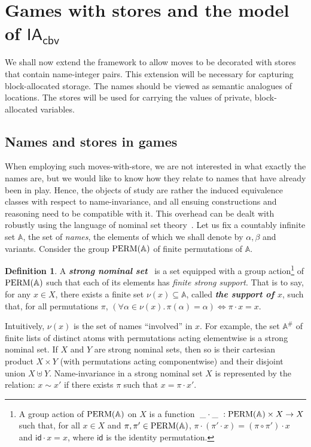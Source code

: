 \documentclass{CSML}
\theoremstyle{definition}\newtheorem{definition}[thm]{Definition}
\theoremstyle{definition}\newtheorem{example}[thm]{Example}
\theoremstyle{definition}\newtheorem{proposition}[thm]{Proposition}
\theoremstyle{definition}\newtheorem{lemma}[thm]{Lemma}
\theoremstyle{definition}\newtheorem{theorem}[thm]{Theorem}
\theoremstyle{definition}\newtheorem{corollary}[thm]{Corollary}
\theoremstyle{definition}\newtheorem{remark}[thm]{Remark}
\newcommand\nb{\beta}
\newcommand\actn{\cdot}
\newcommand\boldemph[1]{\emph{\textbf{#1}}}
\newcommand{\permg}{{\rm PERM}}
\newcommand\A{\mathbb{A}}
\newcommand\iacbv{\mathsf{IA}_{\mathsf{cbv}}}
\newcommand\na\alpha
\begin{document}
\section{Games with stores and the model of \texorpdfstring{$\iacbv$}{IAcbv}}

We shall now extend the framework to allow moves to be decorated with
stores that contain name-integer pairs. 
This extension will be necessary for capturing block-allocated storage.
The names should be viewed as semantic analogues of locations.
The stores will be used for carrying the values of private, block-allocated variables.

\subsection{Names and stores in games}

When employing such moves-with-store, we are not interested in what exactly the names are,
but we would like to know how they relate to names that have already been in play. Hence,
the objects of study are rather the induced equivalence classes with respect to name-invariance, and all ensuing constructions and reasoning need to be compatible with it. This overhead can be dealt with robustly using the language of nominal set theory~\cite{GP02}.
Let us fix a countably infinite set $\A$, the set of \emph{names}, the elements of which we shall denote by $\na,\nb$ and variants. Consider the group $\permg(\A)$ of finite permutations of $\A$. 

\begin{definition}
A \boldemph{strong nominal set}~\cite{GP02,Tze09}
is a set equipped with a group action\footnote{A group action of $\permg(\A)$ on $X$ is a function\, $\_\cdot\_\ :\permg(\A)\times X\rightarrow X$\, such that, for all $x\in X$ and $\pi,\pi'\in\permg(\A)$, $\pi\cdot(\pi'\cdot x)=(\pi\circ\pi')\cdot x$  and $\mathsf{id}\cdot x = x$, where $\mathsf{id}$ is the identity permutation.}
of $\permg(\A)$
such that each of its elements has \emph{finite strong support}. That is to say, for any $x\in X$,
there exists a finite set $\nu(x)\subseteq\A$, called \boldemph{the support of $x$}, such that, for all permutations $\pi$, $(\forall{\na\in\nu(x)}.\,\pi(\na)=\na)\iff \pi\cdot x=x$.
\end{definition}

Intuitively, $\nu(x)$ is the set of names ``involved'' in $x$.
For example, the set $\A^\#$ of finite lists of distinct atoms with permutations acting elementwise is a strong nominal set.
If $X$ and $Y$ are strong nominal sets, then so is their cartesian product $X\times Y$ (with permutations acting componentwise) and their disjoint union $X\uplus Y$.
Name-invariance in a strong nominal set $X$ is represented by the relation: $x\sim x'$ if there exists $\pi$ such that $x=\pi\actn x'$.
\end{document}
